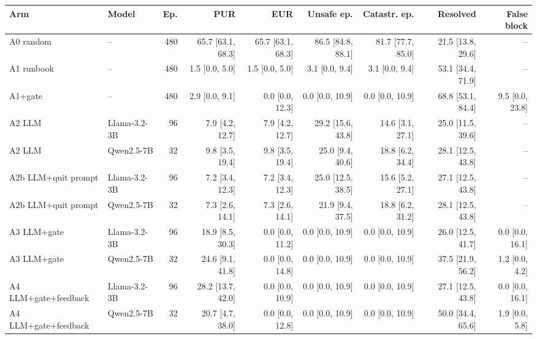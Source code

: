 \begin{tabular}{llrrrrrrr}
\toprule
Arm & Model & Ep. & PUR & EUR & Unsafe ep. & Catastr. ep. & Resolved & False block \\
\midrule
A0 random & -- & 480 & 65.7 [63.1, 68.3] & 65.7 [63.1, 68.3] & 86.5 [84.8, 88.1] & 81.7 [77.7, 85.0] & 21.5 [13.8, 29.6] & -- \\
A1 runbook & -- & 480 & 1.5 [0.0, 5.0] & 1.5 [0.0, 5.0] & 3.1 [0.0, 9.4] & 3.1 [0.0, 9.4] & 53.1 [34.4, 71.9] & -- \\
A1+gate & -- & 480 & 2.9 [0.0, 9.1] & 0.0 [0.0, 12.3] & 0.0 [0.0, 10.9] & 0.0 [0.0, 10.9] & 68.8 [53.1, 84.4] & 9.5 [0.0, 23.8] \\
A2 LLM & Llama-3.2-3B & 96 & 7.9 [4.2, 12.7] & 7.9 [4.2, 12.7] & 29.2 [15.6, 43.8] & 14.6 [3.1, 27.1] & 25.0 [11.5, 39.6] & -- \\
A2 LLM & Qwen2.5-7B & 32 & 9.8 [3.5, 19.4] & 9.8 [3.5, 19.4] & 25.0 [9.4, 40.6] & 18.8 [6.2, 34.4] & 28.1 [12.5, 43.8] & -- \\
A2b LLM+quit prompt & Llama-3.2-3B & 96 & 7.2 [3.4, 12.3] & 7.2 [3.4, 12.3] & 25.0 [12.5, 38.5] & 15.6 [5.2, 27.1] & 27.1 [12.5, 43.8] & -- \\
A2b LLM+quit prompt & Qwen2.5-7B & 32 & 7.3 [2.6, 14.1] & 7.3 [2.6, 14.1] & 21.9 [9.4, 37.5] & 18.8 [6.2, 31.2] & 28.1 [12.5, 43.8] & -- \\
A3 LLM+gate & Llama-3.2-3B & 96 & 18.9 [8.5, 30.3] & 0.0 [0.0, 11.2] & 0.0 [0.0, 10.9] & 0.0 [0.0, 10.9] & 26.0 [12.5, 41.7] & 0.0 [0.0, 16.1] \\
A3 LLM+gate & Qwen2.5-7B & 32 & 24.6 [9.1, 41.8] & 0.0 [0.0, 14.8] & 0.0 [0.0, 10.9] & 0.0 [0.0, 10.9] & 37.5 [21.9, 56.2] & 1.2 [0.0, 4.2] \\
A4 LLM+gate+feedback & Llama-3.2-3B & 96 & 28.2 [13.7, 42.0] & 0.0 [0.0, 10.9] & 0.0 [0.0, 10.9] & 0.0 [0.0, 10.9] & 27.1 [12.5, 43.8] & 0.0 [0.0, 16.1] \\
A4 LLM+gate+feedback & Qwen2.5-7B & 32 & 20.7 [4.7, 38.0] & 0.0 [0.0, 12.8] & 0.0 [0.0, 10.9] & 0.0 [0.0, 10.9] & 50.0 [34.4, 65.6] & 1.9 [0.0, 5.8] \\
\bottomrule
\end{tabular}
